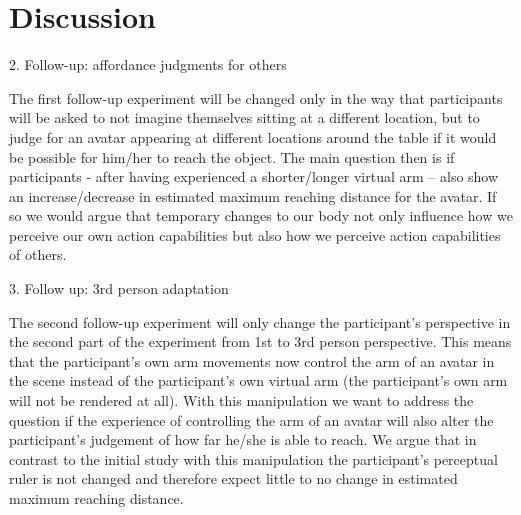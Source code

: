 \section{Discussion}\label{discussion}

2. Follow-up: affordance judgments for others

The first follow-up experiment will be changed only in the way that participants will be asked to not imagine themselves sitting at a different location, but to judge for an avatar appearing at different locations around the table if it would be possible for him/her to reach the object. 
The main question then is if participants - after having experienced a shorter/longer virtual arm – also show an increase/decrease in estimated maximum reaching distance for the avatar. If so we would argue that temporary changes to our body not only influence how we perceive our own action capabilities but also how we perceive action capabilities of others.

3. Follow up: 3rd person adaptation

The second follow-up experiment will only change the participant’s perspective in the second part of the experiment from 1st to 3rd person perspective. This means that the participant’s own arm movements now control the arm of an avatar in the scene instead of the participant’s own virtual arm (the participant’s own arm will not be rendered at all). 
With this manipulation we want to address the question if the experience of controlling the arm of an avatar will also alter the participant’s judgement of how far he/she is able to reach. We argue that in contrast to the initial study with this manipulation the participant’s perceptual ruler is not changed and therefore expect little to no change in estimated maximum reaching distance.